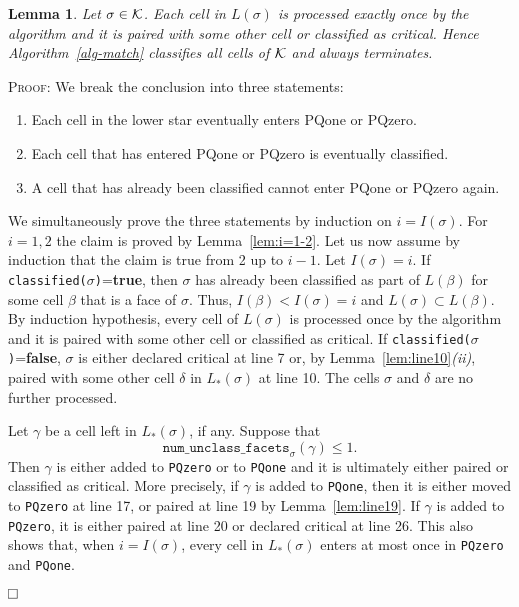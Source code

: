 \documentclass[12pt]{article}
\newtheorem{lem}[thm]{Lemma}
\newenvironment{proof}{\noindent\textsc{Proof: }}{\hfill$\fbox{}$\par\medskip\par}
\newenvironment{aenum}{\begin{enumerate}
 \renewcommand{\theenumi}{\alph{enumi}}
 \renewcommand{\labelenumi}{(\theenumi)}}{\end{enumerate}}
\newcommand{\cK}{{\cal K}}
\begin{document}
\begin{lem}\label{lem:correctness3}
Let $\sigma\in \cK$. Each cell in $L(\sigma)$ is processed exactly once by the algorithm
and it is paired with some other cell or classified as critical. Hence Algorithm~\ref{alg-match} classifies all cells of $\cK$ and always terminates.
\end{lem}

\begin{proof} We break the conclusion into three statements:
\begin{aenum}
\item Each cell in the lower star eventually enters PQone or PQzero.
\item Each cell that has entered PQone or PQzero is eventually classified.
\item A cell that has already been classified cannot enter PQone or PQzero again.
\end{aenum}

We simultaneously prove the three statements by induction on $i=I(\sigma)$. For $i=1,2$ the claim is proved by Lemma~\ref{lem:i=1-2}. Let us now assume by induction that the claim is true from 2 up to $i-1$. Let $I(\sigma)=i$. If \texttt{classified($\sigma$)}={\bf true}, then $\sigma$ has already been classified as part of $L(\beta)$ for some cell $\beta$ that is a face of $\sigma$. Thus, $I(\beta) < I(\sigma) = i$ and $L(\sigma) \subset L(\beta)$. By induction hypothesis, every cell of $L(\sigma)$ is processed once by the algorithm
and it is paired with some other cell or classified as critical. If \texttt{classified($\sigma$)}={\bf false}, $\sigma$ is  either declared critical at line 7 or, by Lemma~\ref{lem:line10}{\em (ii)}, paired with some other cell $\delta$ in $L_* (\sigma)$ at line 10. The cells $\sigma$ and $\delta$ are no further processed.

Let $\gamma$ be a cell left in $L_*(\sigma)$, if any. Suppose that
\begin{equation}\label{eq:dimleq1}
\texttt{{num}\_{unclass}\_{facets}}_{\sigma}(\gamma)\leq 1.
\end{equation}
Then $\gamma$ is either added to \texttt{PQzero} or to \texttt{PQone} and it is ultimately either paired or classified as critical. More precisely, if $\gamma$ is added to \texttt{PQone}, then it is either moved to \texttt{PQzero} at line 17, or paired at line 19 by Lemma~\ref{lem:line19}. If $\gamma$ is added to \texttt{PQzero}, it is either paired at line 20 or declared critical at line 26. This also shows that, when $i=I(\sigma)$, every cell in $L_* (\sigma)$ enters at most once in \texttt{PQzero} and \texttt{PQone}.


\end{proof}
\end{document}
